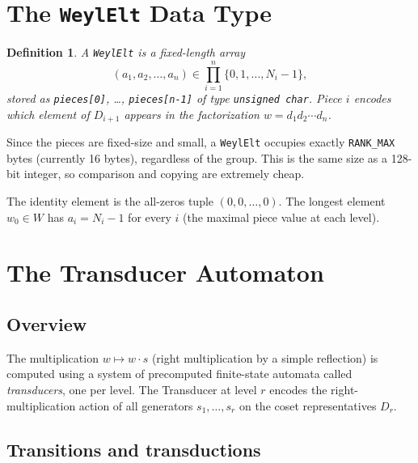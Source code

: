 \documentclass[12pt]{amsart}
\newtheorem{definition}[theorem]{Definition}
\begin{document}
\section{The \texttt{WeylElt} Data Type}

\begin{definition}
A \texttt{WeylElt} is a fixed-length array
\[
  (a_1, a_2, \ldots, a_n) \in \prod_{i=1}^n \{0, 1, \ldots, N_i - 1\},
\]
stored as \texttt{pieces[0]}, \ldots, \texttt{pieces[n-1]} of type
\texttt{unsigned char}.  Piece $i$ encodes which element of $D_{i+1}$ appears
in the factorization $w = d_1 d_2 \cdots d_n$.
\end{definition}

Since the pieces are fixed-size and small, a \texttt{WeylElt} occupies exactly
\texttt{RANK\_MAX} bytes (currently 16 bytes), regardless of the group.  This
is the same size as a 128-bit integer, so comparison and copying are extremely
cheap.

The identity element is the all-zeros tuple $(0, 0, \ldots, 0)$.  The longest
element $w_0 \in W$ has $a_i = N_i - 1$ for every $i$ (the maximal piece value
at each level).

\section{The Transducer Automaton}

\subsection{Overview}

The multiplication $w \mapsto w \cdot s$ (right multiplication by a simple
reflection) is computed using a system of precomputed finite-state automata
called \emph{transducers}, one per level.  The Transducer at level $r$ encodes
the right-multiplication action of all generators $s_1, \ldots, s_r$ on the
coset representatives $D_r$.

\subsection{Transitions and transductions}
\end{document}
